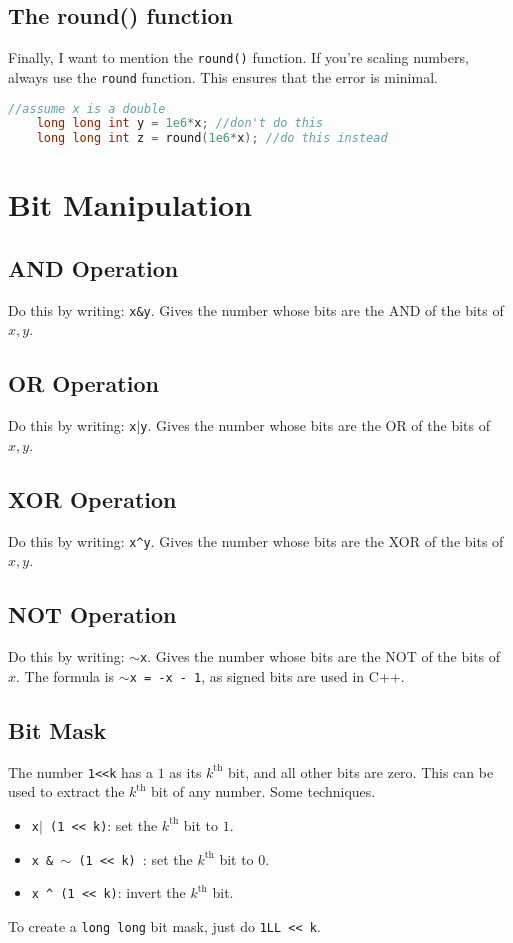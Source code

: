 \documentclass[12pt,a4paper]{amsart}
\numberwithin{equation}{section}
\theoremstyle{definition}
\begin{document}
\subsection{The round() function} Finally, I want to mention the \verb|round()| function. If you're scaling numbers, always use the \verb|round| function. This ensures that the error is minimal.
\begin{lstlisting}[language=C++]
    //assume x is a double
    long long int y = 1e6*x; //don't do this 
    long long int z = round(1e6*x); //do this instead
\end{lstlisting}

\section{Bit Manipulation}

\subsection{AND Operation} Do this by writing: \verb|x&y|. Gives the number whose bits are the AND of the bits of $x,y$.

\subsection{OR Operation} Do this by writing: \verb|x|$|$\verb|y|. Gives the number whose bits are the OR of the bits of $x,y$.

\subsection{XOR Operation} Do this by writing: \verb|x^y|. Gives the number whose bits are the XOR of the bits of $x,y$.

\subsection{NOT Operation} Do this by writing: $\sim$\verb|x|. Gives the number whose bits are the NOT of the bits of $x$. The formula is $\sim$\verb|x = -x - 1|, as signed bits are used in C++.

\subsection{Bit Mask} The number \verb|1<<k| has a $1$ as its $k^\text{th}$ bit, and all other bits are zero. This can be used to extract the $k^{\text{th}}$ bit of any number. Some techniques. 
\begin{itemize}
    \item \verb|x|$|$\verb| (1 << k)|: set the $k^\text{th}$ bit to $1$.
    \item \verb|x & |$\sim$\verb| (1 << k) |: set the $k^\text{th}$ bit to $0$.
    \item \verb|x ^ (1 << k)|: invert the $k^\text{th}$ bit.
\end{itemize}
To create a \verb|long long| bit mask, just do \verb|1LL << k|.
\end{document}
